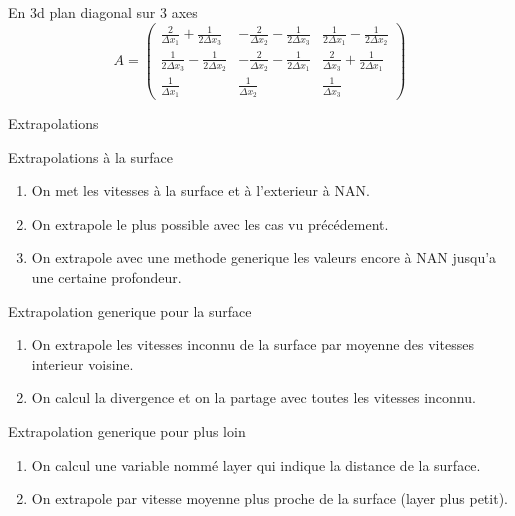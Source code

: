 \begin{frame}[shrink]{En 3d plan diagonal sur 3 axes}
\begin{equation*}
 A=\begin{pmatrix}
    \frac{2}{\Delta x_1}+\frac{1}{2\Delta x_3}&-\frac{2}{\Delta x_2}-\frac{1}{2\Delta x_3}&\frac{1}{2\Delta x_1}-\frac{1}{2\Delta x_2}\\
    \frac{1}{2\Delta x_3}-\frac{1}{2\Delta x_2}&-\frac{2}{\Delta x_2}-\frac{1}{2\Delta x_1}&\frac{2}{\Delta x_3}+\frac{1}{2\Delta x_1}\\
    \frac{1}{\Delta x_1}&\frac{1}{\Delta x_2}&\frac{1}{\Delta x_3}
   \end{pmatrix}
\end{equation*}
\end{frame}

\begin{frame}[shrink]{Extrapolations}
\begin{block}{Extrapolations à la surface}

\begin{enumerate}
 \item On met les vitesses à la surface et à l'exterieur à NAN.
 \item On extrapole le plus possible avec les cas vu précédement.
 \item On extrapole avec une methode generique les valeurs encore à NAN jusqu'a une certaine profondeur.
\end{enumerate}

\end{block}
\begin{block}{Extrapolation generique pour la surface}
\begin{enumerate}
 \item On extrapole les vitesses inconnu de la surface par moyenne des vitesses interieur voisine.
 \item On calcul la divergence et on la partage avec toutes les vitesses inconnu.
\end{enumerate}
\end{block}

\begin{block}{Extrapolation generique pour plus loin}
\begin{enumerate}
 \item On calcul une variable nommé layer qui indique la distance de la surface.
 \item On extrapole par vitesse moyenne plus proche de la surface (layer plus petit).
\end{enumerate}

 
\end{block}
 
\end{frame}

